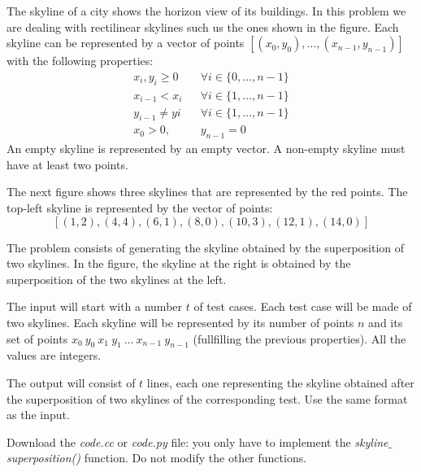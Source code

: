 
\Statement

The skyline of a city shows the horizon view of its buildings. In this problem we are dealing with rectilinear skylines such us the ones shown in the figure.
Each skyline can be represented by a vector of points $[(x_0,y_0),\ldots,(x_{n-1},y_{n-1})]$ with the following properties:
\begin{eqnarray*}
    x_i, y_i \geq 0 & & \forall i\in\{0,\ldots,n-1\}\\
    x_{i-1} < x_i & & \forall i\in\{1,\ldots,n-1\}\\
    y_{i-1} \neq y{i} & & \forall i\in\{1,\ldots,n-1\}\\
    x_0 > 0, & & y_{n-1} = 0
\end{eqnarray*}
An empty skyline is represented by an empty vector. A non-empty skyline must have at least two points.

\medskip

The next figure shows three skylines that are represented by the red points. The top-left skyline is represented by the vector of points:
\[ [(1,2), (4,4), (6,1), (8,0), (10,3), (12,1), (14,0)] \]


The problem consists of generating the skyline obtained by the superposition of two skylines. In the figure, the skyline at the right is obtained by the superposition of the two skylines at the left.

\Input

The input will start with a number $t$ of test cases.
Each test case will be made of two skylines.
Each skyline will be represented by its number of points $n$ and
its set of points $x_0~y_0~x_1~y_1~\ldots~x_{n-1}~y_{n-1}$
(fullfilling the previous properties).
All the values are integers.


\Output

The output will consist of $t$ lines,
each one representing the skyline obtained after the superposition
of two skylines of the corresponding test.
Use the same format as the input.

\Observation

Download the \emph{code.cc} or \emph{code.py} file: you only have to implement the
\emph{skyline$\_$superposition()} function. Do not modify the other functions.


\clearpage

\SampleTwoCol
